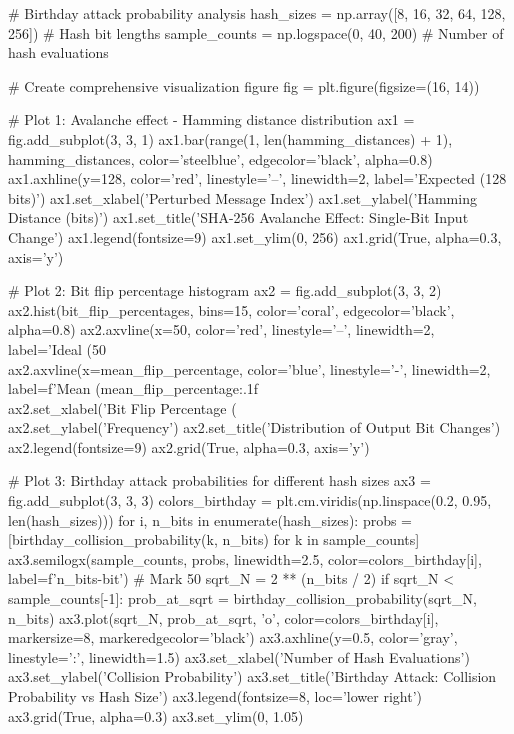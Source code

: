 \documentclass[a4paper, 11pt]{article}
\begin{document}
\begin{pycode}
# Birthday attack probability analysis
hash_sizes = np.array([8, 16, 32, 64, 128, 256])  # Hash bit lengths
sample_counts = np.logspace(0, 40, 200)  # Number of hash evaluations

# Create comprehensive visualization figure
fig = plt.figure(figsize=(16, 14))

# Plot 1: Avalanche effect - Hamming distance distribution
ax1 = fig.add_subplot(3, 3, 1)
ax1.bar(range(1, len(hamming_distances) + 1), hamming_distances,
        color='steelblue', edgecolor='black', alpha=0.8)
ax1.axhline(y=128, color='red', linestyle='--', linewidth=2,
            label='Expected (128 bits)')
ax1.set_xlabel('Perturbed Message Index')
ax1.set_ylabel('Hamming Distance (bits)')
ax1.set_title('SHA-256 Avalanche Effect: Single-Bit Input Change')
ax1.legend(fontsize=9)
ax1.set_ylim(0, 256)
ax1.grid(True, alpha=0.3, axis='y')

# Plot 2: Bit flip percentage histogram
ax2 = fig.add_subplot(3, 3, 2)
ax2.hist(bit_flip_percentages, bins=15, color='coral', edgecolor='black', alpha=0.8)
ax2.axvline(x=50, color='red', linestyle='--', linewidth=2, label='Ideal (50\\%
ax2.axvline(x=mean_flip_percentage, color='blue', linestyle='-', linewidth=2,
            label=f'Mean ({mean_flip_percentage:.1f}\\%
ax2.set_xlabel('Bit Flip Percentage (\\%
ax2.set_ylabel('Frequency')
ax2.set_title('Distribution of Output Bit Changes')
ax2.legend(fontsize=9)
ax2.grid(True, alpha=0.3, axis='y')

# Plot 3: Birthday attack probabilities for different hash sizes
ax3 = fig.add_subplot(3, 3, 3)
colors_birthday = plt.cm.viridis(np.linspace(0.2, 0.95, len(hash_sizes)))
for i, n_bits in enumerate(hash_sizes):
    probs = [birthday_collision_probability(k, n_bits) for k in sample_counts]
    ax3.semilogx(sample_counts, probs, linewidth=2.5,
                 color=colors_birthday[i], label=f'{n_bits}-bit')
    # Mark 50%
    sqrt_N = 2 ** (n_bits / 2)
    if sqrt_N < sample_counts[-1]:
        prob_at_sqrt = birthday_collision_probability(sqrt_N, n_bits)
        ax3.plot(sqrt_N, prob_at_sqrt, 'o', color=colors_birthday[i],
                markersize=8, markeredgecolor='black')
ax3.axhline(y=0.5, color='gray', linestyle=':', linewidth=1.5)
ax3.set_xlabel('Number of Hash Evaluations')
ax3.set_ylabel('Collision Probability')
ax3.set_title('Birthday Attack: Collision Probability vs Hash Size')
ax3.legend(fontsize=8, loc='lower right')
ax3.grid(True, alpha=0.3)
ax3.set_ylim(0, 1.05)


\end{pycode}
\end{document}
